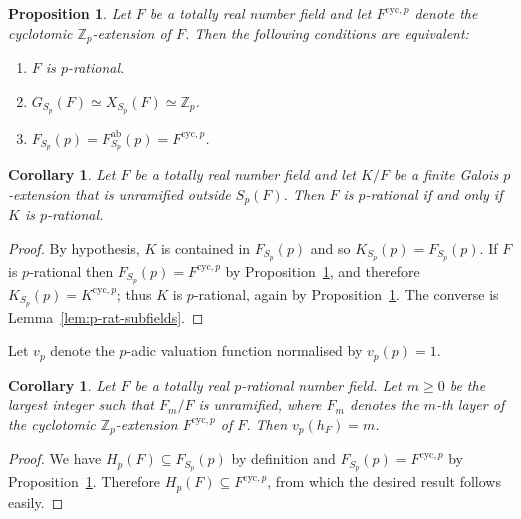 \documentclass[12pt, a4paper, usenames]{amsart}
\newcommand{\Z}{\mathbb{Z}}
\theoremstyle{plain}
\newtheorem{corollary}[theorem]{Corollary}
\newtheorem{prop}[theorem]{Proposition}
\theoremstyle{remark}
\theoremstyle{definition}
\begin{document}
\begin{prop}\label{prop:tot-real-p-rat-equivs}
Let $F$ be a totally real number field and let $F^{\mathrm{cyc},p}$
denote the cyclotomic $\Z_{p}$-extension of $F$.
Then the following conditions are equivalent:
\begin{enumerate}
    \item $F$ is $p$-rational. 
    \item $G_{S_{p}}(F) \simeq X_{S_{p}}(F) \simeq \Z_{p}$.
    \item $F_{S_{p}}(p)  = F_{S_{p}}^{\mathrm{ab}}(p) = F^{\mathrm{cyc},p}$.
\end{enumerate}
\end{prop}

\begin{corollary}\label{cor:p-rat-going-up}
Let $F$ be a totally real number field and 
let $K/F$ be a finite Galois $p$-extension that is unramified outside
$S_{p}(F)$. Then $F$ is $p$-rational if and only if $K$ is $p$-rational.
\end{corollary}

\begin{proof}
By hypothesis, $K$ is contained in $F_{S_{p}}(p)$ and so $K_{S_{p}}(p) = F_{S_{p}}(p)$.
If $F$ is $p$-rational then $F_{S_{p}}(p) = F^{\mathrm{cyc},p}$ by 
Proposition~\ref{prop:tot-real-p-rat-equivs}, and therefore 
$K_{S_{p}}(p) = K^{\mathrm{cyc},p}$; thus $K$ is $p$-rational, again by Proposition~\ref{prop:tot-real-p-rat-equivs}.
The converse is Lemma~\ref{lem:p-rat-subfields}.
\end{proof}

Let $v_{p}$ denote the $p$-adic valuation function normalised by $v_{p}(p)=1$.

\begin{corollary}\label{cor:tot-real-p-rat-class-number}
Let $F$ be a totally real $p$-rational number field.
Let $m \geq 0$ be the largest integer such that $F_{m}/F$ is unramified,
where $F_{m}$ denotes the $m$-th layer of the cyclotomic $\Z_{p}$-extension $F^{\mathrm{cyc},p}$ of $F$. Then $v_{p}(h_{F})=m$.    
\end{corollary}

\begin{proof}
We have $H_{p}(F) \subseteq F_{S_{p}}(p)$ by definition and   
$F_{S_{p}}(p) = F^{\mathrm{cyc},p}$ by Proposition~\ref{prop:tot-real-p-rat-equivs}.
Therefore $H_{p}(F) \subseteq F^{\mathrm{cyc},p}$, 
from which the desired result follows easily.
\end{proof}
\end{document}

